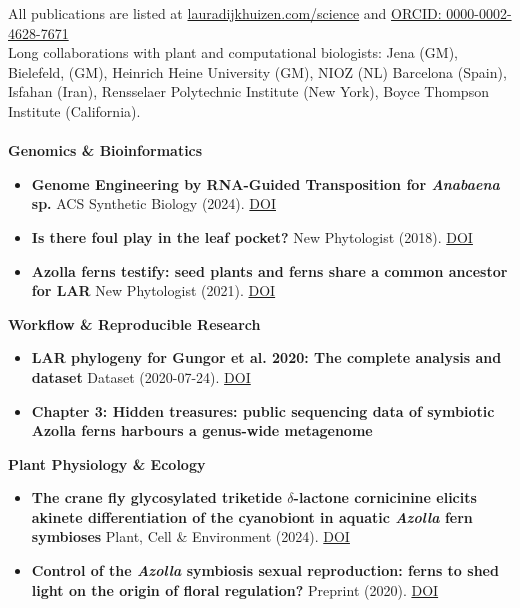\documentclass[a4paper,10pt]{article}
\begin{document}
\noindent All publications are listed at \href{https://lauradijkhuizen.com/science}{lauradijkhuizen.com/science}  and 
\textcolor[HTML]{A6CE39}{\faOrcid}\href{https://orcid.org/0000-0002-4628-7671}{ORCID: 0000-0002-4628-7671}
\\
\noindent Long collaborations with plant and computational biologists: Jena (GM), Bielefeld, (GM), Heinrich Heine University (GM), NIOZ (NL) Barcelona (Spain), Isfahan (Iran), Rensselaer Polytechnic Institute (New York), Boyce Thompson Institute (California). \\
\\
\noindent\textbf{Genomics \& Bioinformatics}
  \begin{itemize}
    \item \textbf{Genome Engineering by RNA-Guided Transposition for \textit{Anabaena} sp.}  
      ACS Synthetic Biology (2024). \href{https://doi.org/10.1021/acssynbio.3c00583}{DOI}
    \item \textbf{Is there foul play in the leaf pocket?}  
      New Phytologist (2018). \href{https://doi.org/10.1111/nph.14843}{DOI}
      \item \textbf{Azolla ferns testify: seed plants and ferns share a common ancestor for LAR}  
        New Phytologist (2021). \href{https://doi.org/10.1111/nph.16896}{DOI}
  \end{itemize}

\noindent\textbf{Workflow \& Reproducible Research}
  \begin{itemize}
    \item \textbf{LAR phylogeny for Gungor et al. 2020: The complete analysis and dataset}  
      Dataset (2020-07-24). \href{https://doi.org/10.5281/zenodo.3959057}{DOI}
    \item \textbf{Chapter 3: Hidden treasures: public sequencing data of symbiotic Azolla ferns harbours a genus-wide metagenome}
  \end{itemize}

\noindent\textbf{Plant Physiology \& Ecology}
  \begin{itemize}
    \item \textbf{The crane fly glycosylated triketide $\delta$-lactone cornicinine elicits akinete differentiation of the cyanobiont in aquatic \textit{Azolla} fern symbioses}  
      Plant, Cell \& Environment (2024). \href{https://doi.org/10.1111/pce.14907}{DOI}
    \item \textbf{Control of the \textit{Azolla} symbiosis sexual reproduction: ferns to shed light on the origin of floral regulation?}  
      Preprint (2020). \href{https://doi.org/10.3389/fpls.2021.693039}{DOI}
  \end{itemize}
\end{document}
